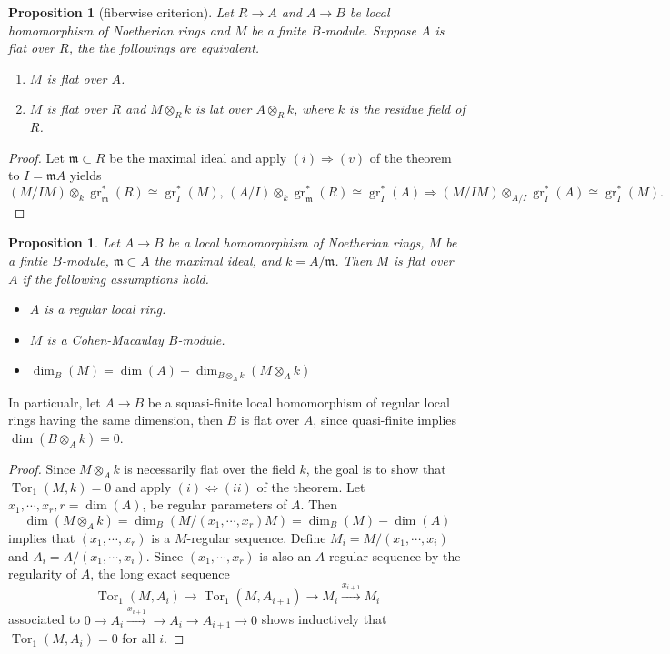 \documentclass[leqno]{amsart}
\DeclareMathOperator{\gr}{gr}
\newcommand{\1}{\mathbf{1}}
\newcommand{\fm}{\mathfrak m}
\DeclareMathOperator{\Tor}{Tor}
\newtheorem{prop}[thm]{Proposition}
\theoremstyle{definition}
\theoremstyle{remark}
\begin{document}
\begin{prop}[fiberwise criterion]
	Let $R\to A$ and $A\to B$ be local homomorphism
	of Noetherian rings and $M$ be a finite $B$-module.
	Suppose $A$ is flat over  $R$,
	the the followings are equivalent.
	 \begin{enumerate}[label=(\alph*)]
		\item $M$ is flat over $A$.
		\item  $M$ is flat over  $R$
		and $M\otimes_Rk$ is  lat over $A\otimes_Rk$,
		where $k$ is the residue field of $R$.
	\end{enumerate}
\end{prop}
\begin{proof}
	Let $\fm\subset R$ be the maximal ideal 
	and apply $(i)\Longrightarrow(v)$ of
	the theorem to $I=\fm A$ yields
	\[
		(M/IM)\otimes_k\gr^*_\fm(R)\cong \gr^*_I(M),\,
		(A/I)\otimes_k\gr^*_\fm(R)\cong \gr^*_I(A)\Longrightarrow
		(M/IM)\otimes_{A/I}\gr^*_I(A)\cong \gr^*_I(M).
	\]
\end{proof}

\begin{prop}
	Let $A\to B$ be a local homomorphism of Noetherian rings,
	$M$ be a fintie $B$-module, 
	$\fm\subset A$ the maximal ideal, and $k=A/\fm$.
	Then $M$ is flat over  $A$ if the following assumptions hold.
	  \begin{itemize}
	 	\item $A$ is a regular local ring.
		\item $M$ is a Cohen-Macaulay $B$-module.
		\item  $\dim_B(M)=\dim(A)+\dim_{B\otimes_Ak}(M\otimes_Ak)$
	 \end{itemize}
\end{prop}
In particualr, let $A\to B$ be a squasi-finite 
local homomorphism of regular local rings having the same dimension,
then  $B$ is flat over  $A$,
since quasi-finite implies  $\dim(B\otimes_Ak)=0$.

\begin{proof}
	Since $M\otimes_Ak$ is necessarily
	flat over the field  $k$,
	the goal is to show that $\Tor_1(M,k)=0$
	and apply $(i)\Longleftrightarrow(ii)$
	of the theorem. 
	Let  $x_1,\cdots,x_r, r=\dim(A)$,
	be regular parameters of $A$.
	Then
	 \[
		 \dim(M\otimes_Ak)
		 =\dim_B(M/(x_1,\cdots,x_r)M)
		 =\dim_B(M)-\dim(A)
	\]
	implies that $(x_1,\cdots,x_r)$
	is a $M$-regular sequence.
	Define  
	$M_i=M/(x_1,\cdots,x_i)$ and 
	$A_i=A/(x_1,\cdots,x_i)$.
	Since $(x_1,\cdots,x_r)$
	is also an $A$-regular sequence
	by the regularity of $A$, 
	the long exact sequence
	\[
	\Tor_1(M,A_i)\to
	\Tor_1(M,A_{i+1})\to
	M_i\xrightarrow{x_{i+1}} M_i
	\]
	associated to 
	$0\to A_i\xrightarrow{x_{i+1}}
	\to A_i\to A_{i+1}\to 0$
	shows inductively that
	$\Tor_1(M,A_{i})=0$ for all $i$.
\end{proof}
\end{document}
